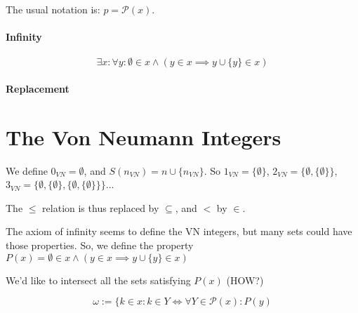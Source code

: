 \documentclass[12pt,a4paper]{report}
\numberwithin{equation}{section}
\theoremstyle{definition}
\theoremstyle{remark}
\begin{document}
The usual notation is: $p = \mathcal{P}(x)$.

\paragraph{Infinity}

\begin{equation}
\exists x: \forall y: \emptyset \in x \wedge (y \in x \implies y \cup \lbrace y \rbrace \in x )
\end{equation}

\paragraph{Replacement}

\section{The Von Neumann Integers}

We define $0_{VN} = \emptyset$, and $S(n_{VN}) =n \cup \lbrace n_{VN} \rbrace$. So $1_{VN} = \lbrace \emptyset \rbrace$, $2_{VN} = \lbrace \emptyset , \lbrace \emptyset \rbrace \rbrace$, $3_{VN} = \lbrace \emptyset , \lbrace \emptyset \rbrace , \lbrace \emptyset , \lbrace \emptyset \rbrace \rbrace \rbrace$...

The $\leq$  relation is thus replaced by $\subseteq$, and $<$ by $\in$.

The axiom of infinity seems to define the VN integers, but many sets could have those properties. So, we define the property $P(x) = \emptyset \in x \wedge (y \in x \implies y \cup \lbrace y \rbrace \in x )$

We'd like to intersect all the sets satisfying $P(x)$ (HOW?)

\begin{equation}
\omega:= \lbrace k \in x : k \in Y \iff \forall Y \in \mathcal{P}(x): P(y)
\end{equation}



\tableofcontents
\end{document}
